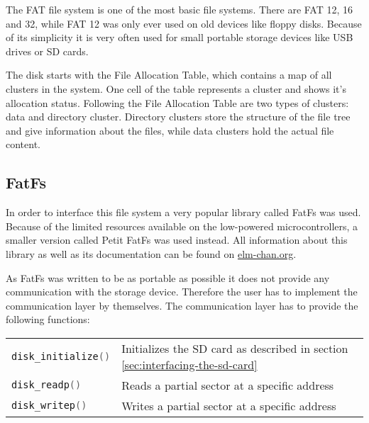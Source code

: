 The FAT file system is one of the most basic file systems. There are FAT 12, 16 and 32, while FAT 12 was only ever used on old devices like floppy disks. Because of its simplicity it is very often used for small portable storage devices like USB drives or SD cards. 

The disk starts with the File Allocation Table, which contains a map of all clusters in the system. One cell of the table represents a cluster and shows it's allocation status. Following the File Allocation Table are two types of clusters: data and directory cluster. Directory clusters store the structure of the file tree and give information about the files, while data clusters hold the actual file content.

\subsection{FatFs}

In order to interface this file system a very popular library called FatFs was used. Because of the limited resources available on the low-powered microcontrollers, a smaller version called Petit FatFs was used instead. All information about this library as well as its documentation can be found on \href{http://elm-chan.org/}{elm-chan.org}.

As FatFs was written to be as portable as possible it does not provide any communication with the storage device. Therefore the user has to implement the communication layer by themselves. %
The communication layer has to provide the following functions:

\begin{tabular}{ll}
    \lstinline[language=C]!disk_initialize()! &  Initializes the SD card as described in section \ref{sec:interfacing-the-sd-card}\\
    \lstinline[language=C]!disk_readp()! & Reads a partial sector at a specific address\\
    \lstinline[language=C]!disk_writep()! & Writes a partial sector at a specific address\\
\end{tabular}

